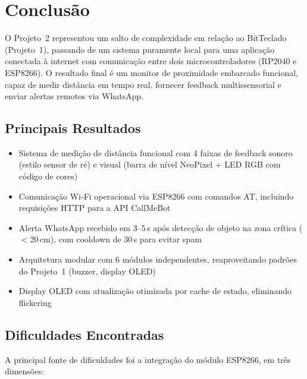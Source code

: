 \documentclass[12pt, a4paper]{article}
\begin{document}
\section{Conclusão}
\label{sec:conclusao}

O Projeto~2 representou um salto de complexidade em relação ao BitTeclado (Projeto~1), passando de um sistema puramente local para uma aplicação conectada à internet com comunicação entre dois microcontroladores (RP2040 e ESP8266). O resultado final é um monitor de proximidade embarcado funcional, capaz de medir distância em tempo real, fornecer feedback multissensorial e enviar alertas remotos via WhatsApp.

\subsection{Principais Resultados}

\begin{itemize}
  \item Sistema de medição de distância funcional com 4 faixas de feedback sonoro (estilo sensor de ré) e visual (barra de nível NeoPixel + LED RGB com código de cores)
  \item Comunicação Wi-Fi operacional via ESP8266 com comandos AT, incluindo requisições HTTP para a API CallMeBot
  \item Alerta WhatsApp recebido em 3--5\,s após detecção de objeto na zona crítica ($<$20\,cm), com cooldown de 30\,s para evitar spam
  \item Arquitetura modular com 6 módulos independentes, reaproveitando padrões do Projeto~1 (buzzer, display OLED)
  \item Display OLED com atualização otimizada por cache de estado, eliminando flickering
\end{itemize}

\subsection{Dificuldades Encontradas}

A principal fonte de dificuldades foi a integração do módulo ESP8266, em três dimensões:
\end{document}
